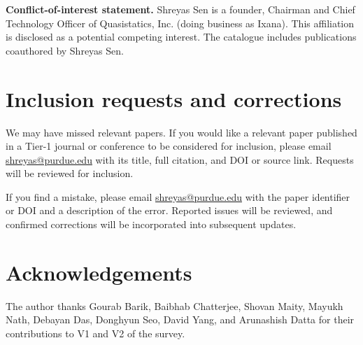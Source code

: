 \documentclass[10pt,letterpaper]{article}
\begin{document}
\textbf{Conflict-of-interest statement.} Shreyas Sen is a founder, Chairman and Chief Technology Officer of Quasistatics, Inc. (doing business as Ixana). This affiliation is disclosed as a potential competing interest. The catalogue includes publications coauthored by Shreyas Sen.

\section*{Inclusion requests and corrections}
We may have missed relevant papers. If you would like a relevant paper published in a Tier-1 journal or conference to be considered for inclusion, please email \href{mailto:shreyas@purdue.edu}{shreyas@purdue.edu} with its title, full citation, and DOI or source link. Requests will be reviewed for inclusion.

If you find a mistake, please email \href{mailto:shreyas@purdue.edu}{shreyas@purdue.edu} with the paper identifier or DOI and a description of the error. Reported issues will be reviewed, and confirmed corrections will be incorporated into subsequent updates.

\section*{Acknowledgements}
The author thanks Gourab Barik, Baibhab Chatterjee, Shovan Maity, Mayukh Nath, Debayan Das, Donghyun Seo, David Yang, and Arunashish Datta for their contributions to V1 and V2 of the survey.

\normalsize

\end{document}
